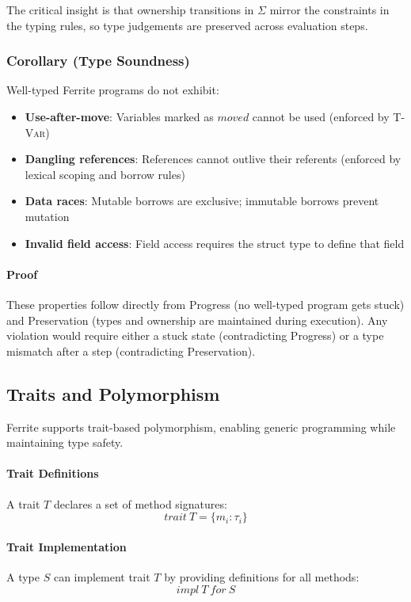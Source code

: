 \documentclass[11pt,a4paper,twoside]{book}
\begin{document}
The critical insight is that ownership transitions in $\Sigma$ mirror the
constraints in the typing rules, so type judgements are preserved across
evaluation steps.


\subsubsection{Corollary (Type Soundness)}

Well-typed Ferrite programs do not exhibit:
\begin{itemize}
  \item \textbf{Use-after-move}: Variables marked as $moved$ cannot be used
    (enforced by \textsc{T-Var})
  \item \textbf{Dangling references}: References cannot outlive their referents
    (enforced by lexical scoping and borrow rules)
  \item \textbf{Data races}: Mutable borrows are exclusive; immutable borrows
    prevent mutation
  \item \textbf{Invalid field access}: Field access requires the struct type to
    define that field
\end{itemize}

\paragraph{Proof}
These properties follow directly from Progress (no well-typed program gets stuck)
and Preservation (types and ownership are maintained during execution). Any
violation would require either a stuck state (contradicting Progress) or a type
mismatch after a step (contradicting Preservation).


\subsection{Traits and Polymorphism}

Ferrite supports trait-based polymorphism, enabling generic programming while
maintaining type safety.

\paragraph{Trait Definitions}
A trait $T$ declares a set of method signatures:
\[
\mathit{trait}\ T = \{m_i : \tau_i\}
\]

\paragraph{Trait Implementation}
A type $S$ can implement trait $T$ by providing definitions for all methods:
\[
\mathit{impl}\ T\ \mathit{for}\ S
\]
\end{document}
